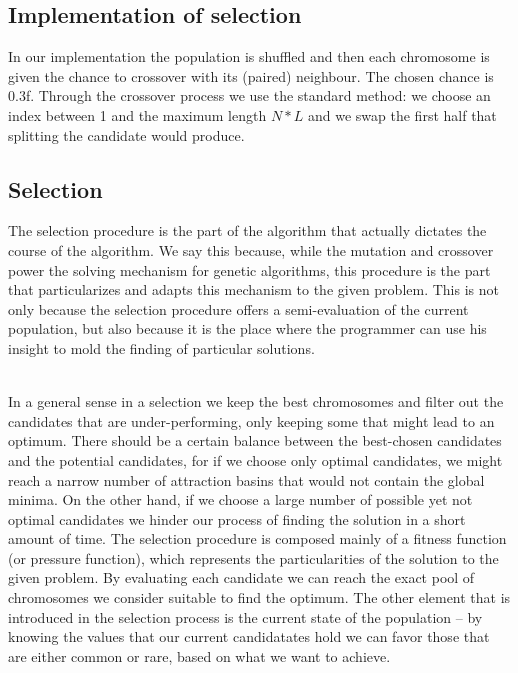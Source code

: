 \documentclass{article}
\begin{document}
\subsection{Implementation of selection}
In our implementation the population is shuffled and then each chromosome is given the chance to crossover with its (paired) neighbour. The chosen chance is 0.3f. Through the crossover process we use the standard method: we choose an index between 1 and the maximum length $N * L$ and we swap the first half that splitting the candidate would produce.

\subsection{Selection}
The selection procedure is the part of the algorithm that actually dictates the course of the algorithm. We say this because, while the mutation and crossover power the solving mechanism for genetic algorithms, this procedure is the part that particularizes and adapts this mechanism to the given problem. This is not only because the selection procedure offers a semi-evaluation of the current population, but also because it is the place where the programmer can use his insight to mold the finding of particular solutions. \\\\
\par In a general sense in a selection we keep the best chromosomes and filter out the candidates that are under-performing, only keeping some that might lead to an optimum. There should be a certain balance between the best-chosen candidates and the potential candidates, for if we choose only optimal candidates, we might reach a narrow number of attraction basins that would not contain the global minima. On the other hand, if we choose a large number of possible yet not optimal candidates we hinder our process of finding the solution in a short amount of time.
The selection procedure is composed mainly of a fitness function (or pressure function), which represents the particularities of the solution to the given problem. By evaluating each candidate we can reach the exact pool of chromosomes we consider suitable to find the optimum. The other element that is introduced in the selection process is the current state of the population – by knowing the values that our current candidatates hold we can favor those that are either common or rare, based on what we want to achieve.
\end{document}
